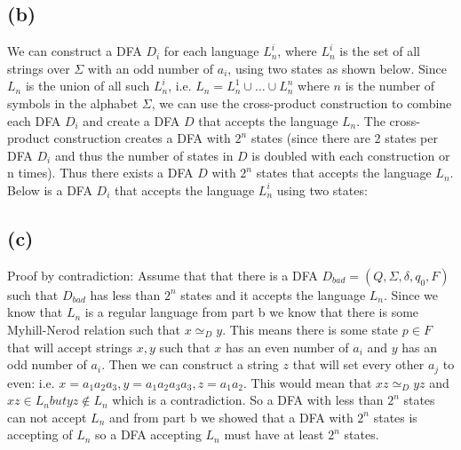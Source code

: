 \documentclass[12pt]{article}
\begin{document}
\subsection*{(b)}
  We can construct a DFA $D_i$ for each language $L^i_n$, where $L^i_n$ is the
  set of all strings over $\Sigma$ with an odd number of $a_i$, using two states
  as shown below. Since $L_n$ is the union of all such $L^i_n$, i.e.
  $L_n = L^1_n \cup \dots \cup L^n_n$ where $n$ is the number of symbols in the
  alphabet $\Sigma$, we can use the cross-product construction to combine each
  DFA $D_i$ and create a DFA $D$ that accepts the language $L_n$.
  The cross-product construction creates a DFA with $2^n$ states (since there
  are 2 states per DFA $D_i$ and thus the number of states in $D$ is doubled
  with each construction or n times). Thus there exists a DFA $D$ with $2^n$
  states that accepts the language $L_n$.
  \vspace{0.5cm}
  Below is a DFA $D_i$ that accepts the language $L^i_n$ using two states:
  \newline
  \begin{center}
  \end{center}

\subsection*{(c)}
Proof by contradiction:\newline
\indent Assume that that there is a DFA $D_{bad} = (Q, \Sigma, \delta, q_0, F)$ such that $D_{bad}$ has less than $2^n$ states and it accepts the language $L_n$. Since we know that $L_n$ is a regular language from part b we know that there is some Myhill-Nerod relation such that $x \simeq_D y$. This means there is some state $p \in F$ that will accept strings $x, y$ such that $x$ has an even number of $a_i$ and $y$ has an odd number of $a_i$. Then we can construct a string $z$ that will set every other $a_j$ to even: i.e. $x = a_1a_2a_3 , y=a_1a_2a_3a_3 , z=a_1a_2$.  This would mean that $xz \simeq_D yz$ and $xz \in L_n but yz \notin L_n$ which is a contradiction. So a DFA with less than $2^n$ states can not accept $L_n$ and from part b we showed that a DFA with $2^n$ states is accepting of $L_n$ so a DFA accepting $L_n$ must have at least $2^n$ states.
\end{document}
